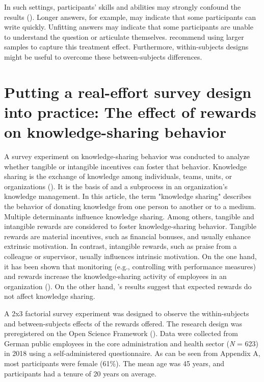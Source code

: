 \documentclass[twocolumn, serif, empirical, authordate]{jote-article}
\begin{document}
In such settings, participants' skills and abilities may strongly confound the results (). Longer answers, for example, may indicate that some participants can write quickly.
Unfitting answers may indicate that some participants are unable to understand the question or articulate themselves. \textcite{Charness2018} recommend using larger samples to capture this treatment effect.
Furthermore, within-subjects designs might be useful to overcome these between-subjects differences.


\section*{Putting a real-effort survey design into practice: The effect of rewards on knowledge-sharing behavior}

A survey experiment on knowledge-sharing behavior was conducted to analyze whether tangible or intangible incentives can foster that behavior. Knowledge sharing is the exchange of knowledge among individuals, teams, units, or organizations ().
It is the basis of and a subprocess in an organization's knowledge management. In this article, the term "knowledge sharing" describes the behavior of donating knowledge from one person to another or to a medium. Multiple determinants influence knowledge sharing. Among others, tangible and intangible rewards are considered to foster knowledge-sharing behavior. Tangible rewards are material incentives, such as financial bonuses, and usually enhance extrinsic motivation. In contrast, intangible rewards, such as praise from a colleague or supervisor, usually influences intrinsic motivation. On the one hand, it has been shown that monitoring (e.g., controlling with performance measures) and rewards increase the knowledge-sharing activity of employees in an organization (). On the other hand, \textcite{Bock2002}'s results suggest that expected rewards do not affect knowledge sharing.

A 2x3 factorial survey experiment was designed to observe the within-subjects and between-subjects effects of the rewards offered. The research design was preregistered on the Open Science Framework (). Data were collected from German public employees in the core administration and health sector (\emph{N} = 623) in 2018 using a self-administered questionnaire. As can be seen from Appendix A, most participants were female (61\%). The mean age was 45 years, and participants had a tenure of 20 years on average.
\end{document}
